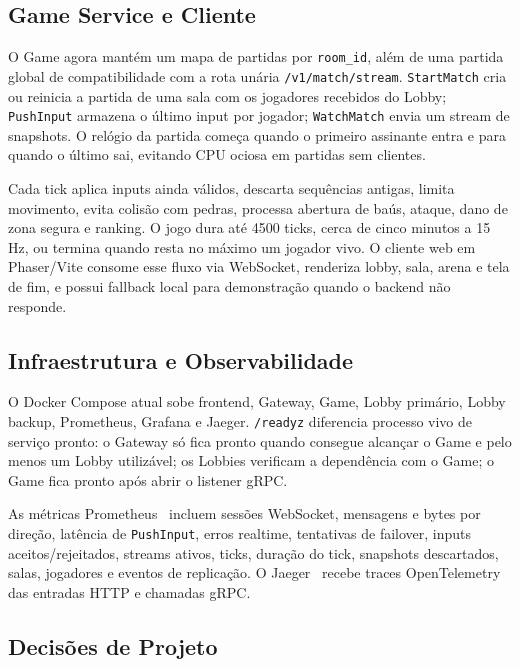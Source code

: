 \documentclass[portuguese]{sbcreviews-2025}%
\begin{document}
\subsection{Game Service e Cliente}

O Game agora mantém um mapa de partidas por \texttt{room\_id}, além de uma partida global de compatibilidade com a rota unária \texttt{/v1/match/stream}. \texttt{StartMatch} cria ou reinicia a partida de uma sala com os jogadores recebidos do Lobby; \texttt{PushInput} armazena o último input por jogador; \texttt{WatchMatch} envia um stream de snapshots. O relógio da partida começa quando o primeiro assinante entra e para quando o último sai, evitando CPU ociosa em partidas sem clientes.

Cada tick aplica inputs ainda válidos, descarta sequências antigas, limita movimento, evita colisão com pedras, processa abertura de baús, ataque, dano de zona segura e ranking. O jogo dura até 4500 ticks, cerca de cinco minutos a 15 Hz, ou termina quando resta no máximo um jogador vivo. O cliente web em Phaser/Vite consome esse fluxo via WebSocket, renderiza lobby, sala, arena e tela de fim, e possui fallback local para demonstração quando o backend não responde.

\subsection{Infraestrutura e Observabilidade}

O Docker Compose atual sobe frontend, Gateway, Game, Lobby primário, Lobby backup, Prometheus, Grafana e Jaeger. \texttt{/readyz} diferencia processo vivo de serviço pronto: o Gateway só fica pronto quando consegue alcançar o Game e pelo menos um Lobby utilizável; os Lobbies verificam a dependência com o Game; o Game fica pronto após abrir o listener gRPC.

As métricas Prometheus~\cite{prometheus} incluem sessões WebSocket, mensagens e bytes por direção, latência de \texttt{PushInput}, erros realtime, tentativas de failover, inputs aceitos/rejeitados, streams ativos, ticks, duração do tick, snapshots descartados, salas, jogadores e eventos de replicação. O Jaeger~\cite{jaeger} recebe traces OpenTelemetry~\cite{opentelemetry} das entradas HTTP e chamadas gRPC.

\subsection{Decisões de Projeto}
\end{document}
